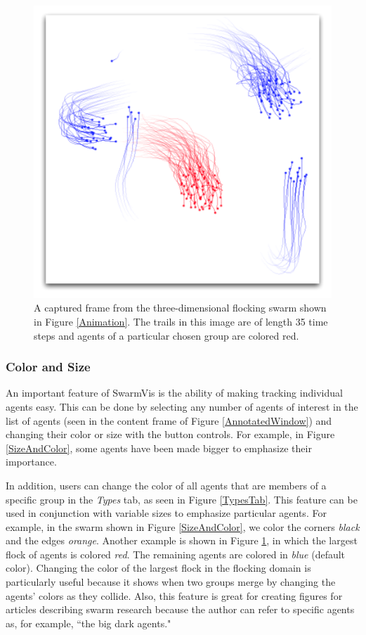 \documentclass[conference]{IEEEtran}
\begin{document}
\begin{figure}
\centering
\includegraphics[scale=.45]{images/flockcolor.pdf}
\caption{
A captured frame from the three-dimensional flocking swarm shown in Figure \ref{Animation}.
The trails in this image are of length 35 time steps and agents of a particular chosen group are colored red.}
\label{FlockColor}
\end{figure}


\subsubsection{Color and Size}

An important feature of SwarmVis is the ability of making tracking individual agents easy.
This can be done by selecting any number of agents of interest in the list of agents
(seen in the content frame of Figure \ref{AnnotatedWindow})
and changing their color or size with the button controls.
For example, in Figure \ref{SizeAndColor}, some agents have been made bigger to emphasize their importance.

In addition, users can change the color of all agents that are members of a specific group in the \textit{Types} tab, as seen
in Figure \ref{TypesTab}.
This feature can be used in conjunction with variable sizes to emphasize particular agents.
For example, in the swarm shown in
Figure \ref{SizeAndColor}, we color the corners \textit{black} and the edges \textit{orange}.
Another example is shown in Figure \ref{FlockColor}, in which the largest flock of agents is colored \textit{red}.
The remaining agents are colored in \textit{blue} (default color).
Changing the color of the largest flock in the flocking domain is
particularly useful because it shows when two groups merge by changing the agents' colors as they collide.
Also, this feature is great for creating figures for articles describing swarm research because
 the author can refer to specific agents as, for example, ``the big dark agents."
\end{document}
